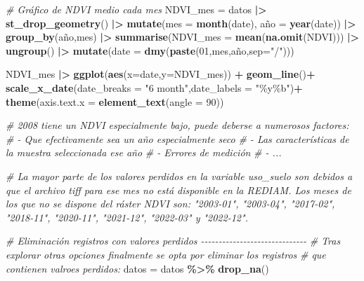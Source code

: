 \documentclass[12pt,a4paper,]{book}
\newenvironment{Shaded}{\begin{snugshade}}{\end{snugshade}}
\newcommand{\AttributeTok}[1]{\textcolor[rgb]{0.13,0.29,0.53}{#1}}
\newcommand{\CommentTok}[1]{\textcolor[rgb]{0.56,0.35,0.01}{\textit{#1}}}
\newcommand{\DecValTok}[1]{\textcolor[rgb]{0.00,0.00,0.81}{#1}}
\newcommand{\FunctionTok}[1]{\textcolor[rgb]{0.13,0.29,0.53}{\textbf{#1}}}
\newcommand{\NormalTok}[1]{#1}
\newcommand{\OtherTok}[1]{\textcolor[rgb]{0.56,0.35,0.01}{#1}}
\newcommand{\SpecialCharTok}[1]{\textcolor[rgb]{0.81,0.36,0.00}{\textbf{#1}}}
\newcommand{\StringTok}[1]{\textcolor[rgb]{0.31,0.60,0.02}{#1}}
\numberwithin{dummy}{section}
\theoremstyle{ocrenumbox}
\theoremstyle{blacknumex}
\theoremstyle{blacknumbox}
\theoremstyle{ocrenum}
\theoremstyle{ocrenum}
\begin{document}
\begin{Shaded}
\begin{Highlighting}[]
\CommentTok{\# Gráfico de NDVI medio cada mes}
\NormalTok{NDVI\_mes }\OtherTok{=}\NormalTok{ datos }\SpecialCharTok{|\textgreater{}} 
  \FunctionTok{st\_drop\_geometry}\NormalTok{() }\SpecialCharTok{|\textgreater{}} 
  \FunctionTok{mutate}\NormalTok{(}\AttributeTok{mes =} \FunctionTok{month}\NormalTok{(date),}
\NormalTok{         año }\OtherTok{=} \FunctionTok{year}\NormalTok{(date)) }\SpecialCharTok{|\textgreater{}} 
  \FunctionTok{group\_by}\NormalTok{(año,mes) }\SpecialCharTok{|\textgreater{}} 
  \FunctionTok{summarise}\NormalTok{(}\AttributeTok{NDVI\_mes =} \FunctionTok{mean}\NormalTok{(}\FunctionTok{na.omit}\NormalTok{(NDVI))) }\SpecialCharTok{|\textgreater{}} 
  \FunctionTok{ungroup}\NormalTok{() }\SpecialCharTok{|\textgreater{}} 
  \FunctionTok{mutate}\NormalTok{(}\AttributeTok{date =} \FunctionTok{dmy}\NormalTok{(}\FunctionTok{paste}\NormalTok{(}\DecValTok{01}\NormalTok{,mes,año,}\AttributeTok{sep=}\StringTok{"/"}\NormalTok{)))}
  
\NormalTok{NDVI\_mes }\SpecialCharTok{|\textgreater{}} 
  \FunctionTok{ggplot}\NormalTok{(}\FunctionTok{aes}\NormalTok{(}\AttributeTok{x=}\NormalTok{date,}\AttributeTok{y=}\NormalTok{NDVI\_mes)) }\SpecialCharTok{+}
  \FunctionTok{geom\_line}\NormalTok{()}\SpecialCharTok{+}
  \FunctionTok{scale\_x\_date}\NormalTok{(}\AttributeTok{date\_breaks =} \StringTok{"6 month"}\NormalTok{,}\AttributeTok{date\_labels =} \StringTok{"\%y\%b"}\NormalTok{)}\SpecialCharTok{+}
  \FunctionTok{theme}\NormalTok{(}\AttributeTok{axis.text.x =} \FunctionTok{element\_text}\NormalTok{(}\AttributeTok{angle =} \DecValTok{90}\NormalTok{))}

\CommentTok{\# 2008 tiene un NDVI especialmente bajo, puede deberse a numerosos factores:}
\CommentTok{\#   {-} Que efectivamente sea un año especialmente seco}
\CommentTok{\#   {-} Las características de la muestra seleccionada ese año}
\CommentTok{\#   {-} Errores de medición}
\CommentTok{\#   {-} ...}

\CommentTok{\# La mayor parte de los valores perdidos en la variable uso\_suelo son debidos a que el archivo tiff para ese mes no está disponible en la REDIAM. Los meses de los que no se dispone del ráster NDVI son: "2003{-}01", "2003{-}04", "2017{-}02", "2018{-}11", "2020{-}11", "2021{-}12", "2022{-}03" y "2022{-}12".}

\CommentTok{\# Eliminación registros con valores perdidos {-}{-}{-}{-}{-}{-}{-}{-}{-}{-}{-}{-}{-}{-}{-}{-}{-}{-}{-}{-}{-}{-}{-}{-}{-}{-}{-}{-}{-}{-}}
\CommentTok{\# Tras explorar otras opciones finalmente se opta por eliminar los registros}
\CommentTok{\# que contienen valroes perdidos:}
\NormalTok{datos }\OtherTok{=}\NormalTok{ datos }\SpecialCharTok{\%\textgreater{}\%} \FunctionTok{drop\_na}\NormalTok{()}


\end{Highlighting}
\end{Shaded}
\end{document}
